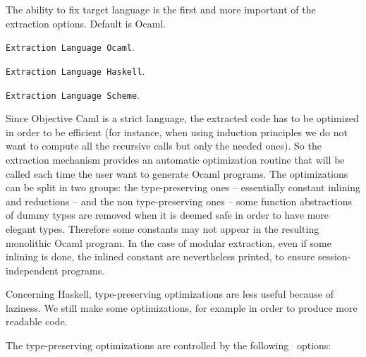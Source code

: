 
The ability to fix target language is the first and more important
of the extraction options. Default is Ocaml.
\begin{description}
\item {\tt Extraction Language Ocaml}.
\item {\tt Extraction Language Haskell}.
\item {\tt Extraction Language Scheme}.
\end{description}


Since Objective Caml is a strict language, the extracted code has to
be optimized in order to be efficient (for instance, when using
induction principles we do not want to compute all the recursive calls
but only the needed ones). So the extraction mechanism provides an
automatic optimization routine that will be called each time the user
want to generate Ocaml programs. The optimizations can be split in two
groups: the type-preserving ones -- essentially constant inlining and
reductions -- and the non type-preserving ones -- some function
abstractions of dummy types are removed when it is deemed safe in order
to have more elegant types. Therefore some constants may not appear in the
resulting monolithic Ocaml program. In the case of modular extraction,
even if some inlining is done, the inlined constant are nevertheless
printed, to ensure session-independent programs.

Concerning Haskell, type-preserving optimizations are less useful
because of laziness. We still make some optimizations, for example in
order to produce more readable code.

The type-preserving optimizations are controlled by the following \Coq\ options:

